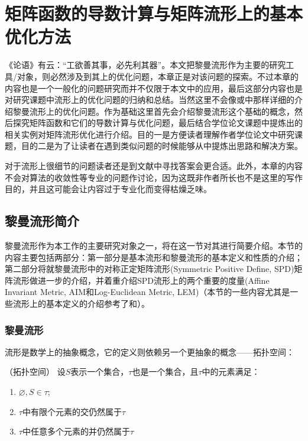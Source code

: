 \chapter{矩阵函数的导数计算与矩阵流形上的基本优化方法}
\label{chap:Matdev_basicManiopt}
《论语》有云：“工欲善其事，必先利其器”。本文把黎曼流形作为主要的研究工具/对象，则必然涉及到其上的优化问题，本章正是对该问题的探索。不过本章的内容也是一个一般化的问题研究而并不仅限于本文中的应用，最后这部分内容也是对研究课题中流形上的优化问题的归纳和总结。当然这里不会像\cite{Maniopt_DiscreteCurveFitting}或\cite{Maniopt_book}中那样详细的介绍黎曼流形上的优化问题。作为基础这里首先会介绍黎曼流形这个基础的概念，然后探究矩阵函数和它们的导数计算与优化问题，最后结合学位论文课题中提炼出的相关实例对矩阵流形优化进行介绍。目的一是方便读者理解作者学位论文中研究课题，目的二是为了让读者在遇到类似问题的时候能够从中提炼出思路和解决方案。

对于流形上很细节的问题读者还是到文献\cite{Maniopt_DiscreteCurveFitting,Maniopt_book}中寻找答案会更合适。此外，本章的内容不会对算法的收敛性等专业的问题作讨论，因为这既非作者所长也不是这里的写作目的，并且这可能会让内容过于专业化而变得枯燥乏味。
\section{黎曼流形简介}
\label{sec:manifold}
黎曼流形作为本工作的主要研究对象之一，将在这一节对其进行简要介绍。本节的内容主要包括两部分：第一部分是基本流形和黎曼流形的基本定义和性质的介绍；第二部分将就黎曼流形中的对称正定矩阵流形(Symmetric Positive Define, SPD)矩阵流形做进一步的介绍，并着重介绍SPD流形上的两个重要的度量(Affine Invariant Metric, AIM和Log-Euclidean Metric, LEM)（本节的一些内容尤其是一些流形上的基本定义的介绍参考了\cite{Manifold}和\cite{PHDThesis}）。
\subsection{黎曼流形}
\label{sec:manifold_Riemaniann}
流形是数学上的抽象概念，它的定义则依赖另一个更抽象的概念——拓扑空间：
\begin{definition}
\label{Topology}
{\heiti（拓扑空间）} 设$S$表示一个集合，$\tau$也是一个集合，且$\tau$中的元素满足：
\begin{enumerate}
\item $\varnothing,S \in \tau$;
\item $\tau$中有限个元素的交仍然属于$\tau$
\item $\tau$中任意多个元素的并仍然属于$\tau$
\end{enumerate}
\end{definition}

